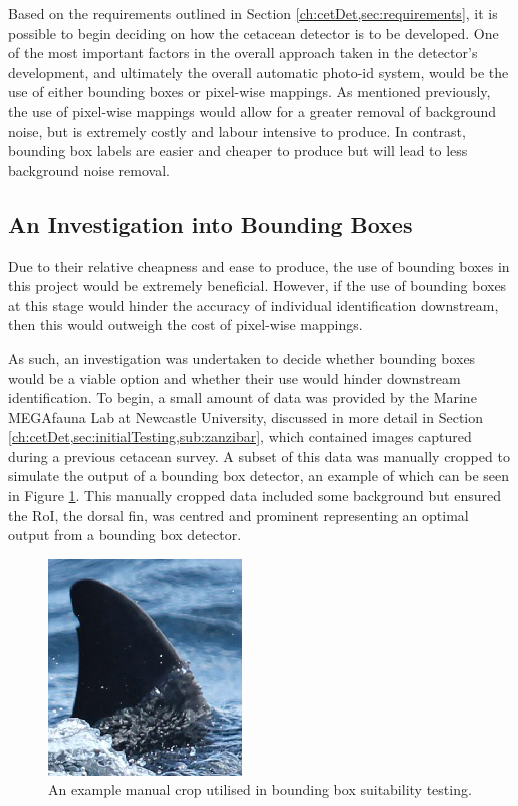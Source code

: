 Based on the requirements outlined in Section \ref{ch:cetDet,sec:requirements}, it is possible to begin deciding on how the cetacean detector is to be developed. One of the most important factors in the overall approach taken in the detector's development, and ultimately the overall automatic photo-id system, would be the use of either bounding boxes or pixel-wise mappings. As mentioned previously, the use of pixel-wise mappings would allow for a greater removal of background noise, but is extremely costly and labour intensive to produce. In contrast, bounding box labels are easier and cheaper to produce but will lead to less background noise removal. 

\subsection{An Investigation into Bounding Boxes}\label{ch:cetDet,sec:deciding,sub:boundingBoxInvestigation}

Due to their relative cheapness and ease to produce, the use of bounding boxes in this project would be extremely beneficial. However, if the use of bounding boxes at this stage would hinder the accuracy of individual identification downstream, then this would outweigh the cost of pixel-wise mappings. 

As such, an investigation was undertaken to decide whether bounding boxes would be a viable option and whether their use would hinder downstream identification. To begin, a small amount of data was provided by the Marine MEGAfauna Lab at Newcastle University, discussed in more detail in Section \ref{ch:cetDet,sec:initialTesting,sub:zanzibar}, which contained images captured during a previous cetacean survey. A subset of this data was manually cropped to simulate the output of a bounding box detector, an example of which can be seen in Figure \ref{fig:manual-crop-example}. This manually cropped data included some background but ensured the RoI, the dorsal fin, was centred and prominent representing an optimal output from a bounding box detector. 

\begin{figure}
	\begin{center}
		\includegraphics[scale=0.6]{Chapter3/figs/manual-crop-example.png}
	\end{center}
	\caption{An example manual crop utilised in bounding box suitability testing.
	}
	\label{fig:manual-crop-example}
\end{figure}

